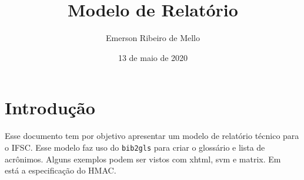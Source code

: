 \documentclass[11pt,a4paper]{ifsctech}
\title{Modelo de Relatório}
\author{Emerson Ribeiro de Mello}
\date{13 de maio de 2020}
\begin{document}




\begin{historico}
\end{historico}

\tableofcontents%
\printunsrtglossary[type=abbreviations]
\printunsrtglossary




\chapter{Introdução}\label{cap:introducao}

Esse documento tem por objetivo apresentar um modelo de relatório técnico para o \gls{IFSC}. Esse modelo faz uso do \texttt{bib2gls} para criar o glossário e lista de acrônimos.  Alguns exemplos podem ser vistos com \gls{xhtml}, \gls{svm} e \gls{matrix}. Em~\cite{rfc2104hmac} está a especificação do \gls{HMAC}.

\printbibliography[heading=bibintoc,title={Referências}]%
\end{document}
